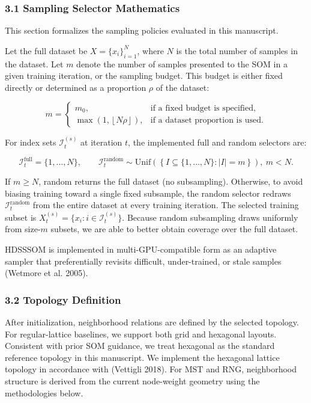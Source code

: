 \documentclass[
]{article}
\begin{document}
\subsubsection{3.1 Sampling Selector
Mathematics}\label{sampling-selector-mathematics}

This section formalizes the sampling policies evaluated in this
manuscript.

Let the full dataset be \(X=\{x_i\}_{i=1}^{N}\), where \(N\) is the
total number of samples in the dataset. Let \(m\) denote the number of
samples presented to the SOM in a given training iteration, or the
sampling budget. This budget is either fixed directly or determined as a
proportion \(\rho\) of the dataset:

\[
m=
\begin{cases}
m_0, & \text{if a fixed budget is specified},\\[4pt]
\max\!\left(1,\left\lfloor N\rho \right\rfloor\right), & \text{if a dataset proportion is used}.
\end{cases}
\tag{1}
\]

For index sets \(\mathcal{I}_t^{(s)}\) at iteration \(t\), the
implemented full and random selectors are:

\[
\mathcal{I}_t^{\mathrm{full}}=\{1,\dots,N\},
\qquad
\mathcal{I}_t^{\mathrm{random}} \sim \mathrm{Unif}\!\left(\left\{I\subseteq\{1,\dots,N\}:|I|=m\right\}\right),\ m<N.
\tag{2}
\]

If \(m\ge N\), random returns the full dataset (no subsampling).
Otherwise, to avoid biasing training toward a single fixed subsample,
the random selector redraws \(\mathcal{I}_t^{\mathrm{random}}\) from the
entire dataset at every training iteration. The selected training subset
is \(X_t^{(s)}=\{x_i:i\in\mathcal{I}_t^{(s)}\}\). Because random
subsampling draws uniformly from size-\(m\) subsets, we are able to
better obtain coverage over the full dataset.

HDSSSOM is implemented in multi-GPU-compatible form as an adaptive
sampler that preferentially revisits difficult, under-trained, or stale
samples (Wetmore et al. 2005).

\subsubsection{3.2 Topology Definition}\label{topology-definition}

After initialization, neighborhood relations are defined by the selected
topology. For regular-lattice baselines, we support both grid and
hexagonal layouts. Consistent with prior SOM guidance, we treat
hexagonal as the standard reference topology in this manuscript. We
implement the hexagonal lattice topology in accordance with (Vettigli
2018). For MST and RNG, neighborhood structure is derived from the
current node-weight geometry using the methodologies below.
\end{document}
